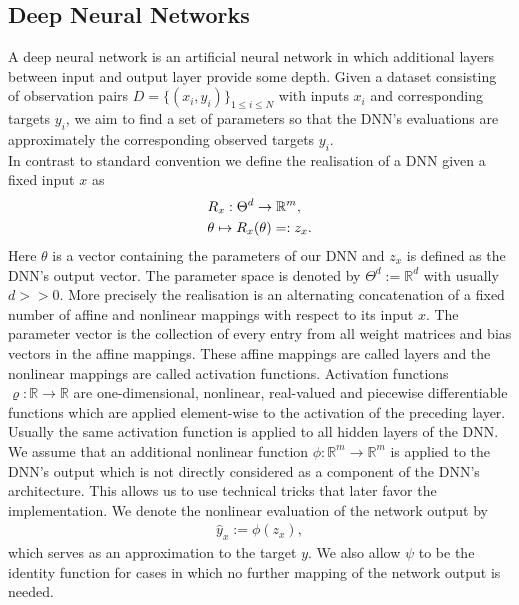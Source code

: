 \documentclass[conference]{IEEEtran}
\begin{document}
\subsection{Deep Neural Networks}
\noindent
A deep neural network is an artificial neural network in which additional layers between input and output layer provide some depth. Given a dataset consisting of observation pairs $D =\{(x_{i}, y_{i})\}_{1\leq i\leq N}$ with inputs $x_{i}$ and corresponding targets $y_{i}$, we aim to find a set of parameters so that the DNN's evaluations are approximately the corresponding observed targets $y_{i}$.\\
In contrast to standard convention we define the realisation of a DNN given a fixed input $x$ as 
\begin{align}
&R_{x}:\Theta^{d}\rightarrow\mathbb{R}^{m}, \notag\\
&\theta\mapsto R_{x}(\theta) =: z_{x}. 
\end{align}
Here $\theta$ is a vector containing the parameters of our DNN and $z_{x}$ is defined as the DNN's output vector. The parameter space is denoted by $\Theta^{d} := \mathbb{R}^{d}$ with usually $d>>0$. More precisely the realisation is an alternating concatenation of a fixed number of affine and nonlinear mappings with respect to its input $x$. The parameter vector is the collection of every entry from all weight matrices and bias vectors in the affine mappings. These affine mappings are called layers and the nonlinear mappings are called activation functions. Activation functions $\varrho:\mathbb{R}\rightarrow\mathbb{R}$ are one-dimensional, nonlinear, real-valued and piecewise differentiable functions which are applied element-wise to the activation of the preceding layer. Usually the same activation function is applied to all hidden layers of the DNN. We assume that an additional nonlinear function $\phi:\mathbb{R}^{m}\rightarrow\mathbb{R}^{m}$ is applied to the DNN's output which is not directly considered as a component of the DNN's architecture. This allows us to use technical tricks that later favor the implementation. We denote the nonlinear evaluation of the network output by 
\begin{align}
\hat{y}_{x} := \phi(z_{x}),
\end{align}
which serves as an approximation to the target $y$. We also allow $\psi$ to be the identity function for cases in which no further mapping of the network output is needed.
\end{document}
